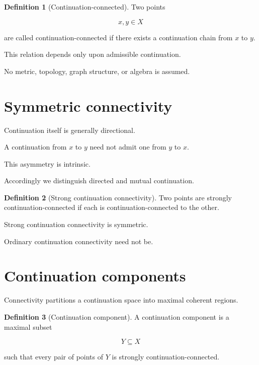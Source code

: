 \documentclass[13pt,openany]{book}
\theoremstyle{plain}
\theoremstyle{definition}
\newtheorem{definition}{Definition}[chapter]
\begin{document}
\begin{definition}[Continuation-connected]
Two points

\[
x,y\in X
\]

are called continuation-connected if there exists a continuation chain from
$x$ to $y$.
\end{definition}

This relation depends only upon admissible continuation.

No metric, topology, graph structure, or algebra is assumed.

\section{Symmetric connectivity}

Continuation itself is generally directional.

A continuation from $x$ to $y$ need not admit one from $y$ to $x$.

This asymmetry is intrinsic.

Accordingly we distinguish directed and mutual continuation.

\begin{definition}[Strong continuation connectivity]
Two points are strongly continuation-connected if each is continuation-connected
to the other.
\end{definition}

Strong continuation connectivity is symmetric.

Ordinary continuation connectivity need not be.

\section{Continuation components}

Connectivity partitions a continuation space into maximal coherent regions.

\begin{definition}[Continuation component]
A continuation component is a maximal subset

\[
Y\subseteq X
\]

such that every pair of points of $Y$ is strongly continuation-connected.
\end{definition}
\end{document}
